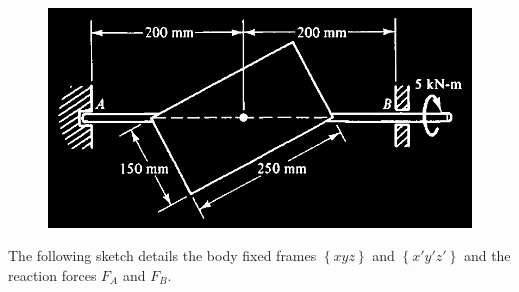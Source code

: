 \documentclass[12pt, letterpaper]{../assignment}
\begin{document}
\begin{figure}[H]
    \centering
    \includegraphics[scale=0.7,frame]{images/Problem_4.png}
\end{figure}

The following sketch details the body fixed frames $\left\{xyz\right\}$ and $\left\{x'y'z'\right\}$
and the reaction forces $F_A$ and $F_B$.
\end{document}
